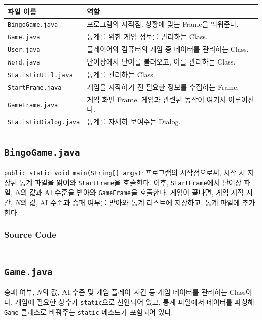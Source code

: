\begin{tabularx}{\textwidth}{l|X}
    \hline
    파일 이름                         & 역할                                  \\
    \hline
    \texttt{BingoGame.java}       & 프로그램의 시작점. 상황에 맞는 Frame을 띄워준다.      \\
    \hline
    \texttt{Game.java}            & 통계를 위한 게임 정보를 관리하는 Class.           \\
    \texttt{User.java}            & 플레이어와 컴퓨터의 게임 중 데이터를 관리하는 Class.    \\
    \texttt{Word.java}            & 단어장에서 단어를 불러오고, 이를 관리하는 Class.      \\
    \hline
    \texttt{StatisticUtil.java}   & 통계를 관리하는 Class.                     \\
    \hline
    \texttt{StartFrame.java}      & 게임을 시작하기 전 필요한 정보를 수집하는 Frame.      \\
    \texttt{GameFrame.java}       & 게임 화면 Frame. 게임과 관련된 동작이 여기서 이루어진다. \\
    \texttt{StatisticDialog.java} & 통계를 자세히 보여주는 Dialog.                \\
    \hline
\end{tabularx}

\subsection{\texttt{BingoGame.java}}
\texttt{public static void main(String[] args)}:
프로그램의 시작점으로써,
시작 시 저장된 통계 파일을 읽어와 \texttt{StartFrame}을 호출한다.
이후, \texttt{StartFrame}에서 단어장 파일, $N$의 값과 AI 수준을 받아와 \texttt{GameFrame}을 호출한다.
게임이 끝나면, 게임 시작 시간, $N$의 값, AI 수준과 승패 여부를 받아와 통계 리스트에 저장하고, 통계 파일에 추가한다.

\subsubsection{Source Code}
\inputminted[fontsize=\scriptsize]{java}{../../src/main/java/ywrhee/project/BingoGame.java}

\newpage
\subsection{\texttt{Game.java}}
승패 여부, $N$의 값, AI 수준 및 게임 플레이 시간 등 게임 데이터를 관리하는 Class이다.
게임에 필요한 상수가 \texttt{static}으로 선언되어 있고, 통계 파일에서 데이터를 파싱해 \texttt{Game} 클래스로 바꿔주는 \texttt{static} 메소드가 포함되어 있다.

